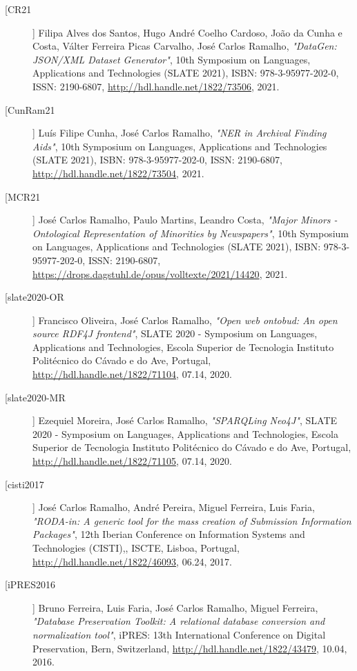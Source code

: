 \begin{description}
\item[[CR21]]
    \textsf{Filipa Alves dos Santos, Hugo André Coelho Cardoso, João da Cunha e Costa, Válter Ferreira Picas Carvalho, José Carlos Ramalho}, \emph{"DataGen: JSON/XML Dataset Generator"}, 10th Symposium on Languages, Applications and Technologies (SLATE 2021), ISBN: 978-3-95977-202-0, ISSN: 2190-6807, \url{http://hdl.handle.net/1822/73506}, 2021.

\item[[CunRam21]]
    \textsf{Luís Filipe Cunha, José Carlos Ramalho}, \emph{"NER in Archival Finding Aids"}, 10th Symposium on Languages, Applications and Technologies (SLATE 2021), ISBN: 978-3-95977-202-0, ISSN: 2190-6807, \url{http://hdl.handle.net/1822/73504}, 2021.

\item[[MCR21]]
    \textsf{José Carlos Ramalho, Paulo Martins, Leandro Costa}, \emph{"Major Minors - Ontological Representation of Minorities by Newspapers"}, 10th Symposium on Languages, Applications and Technologies (SLATE 2021), ISBN: 978-3-95977-202-0, ISSN: 2190-6807, \url{https://drops.dagstuhl.de/opus/volltexte/2021/14420}, 2021.

\item[[slate2020-OR]]
    \textsf{Francisco Oliveira, José Carlos Ramalho}, \emph{"Open web ontobud: An open source RDF4J frontend"}, SLATE 2020 - Symposium on Languages, Applications and Technologies, Escola Superior de Tecnologia Instituto Politécnico do Cávado e do Ave, Portugal, \url{http://hdl.handle.net/1822/71104}, 07.14, 2020.

\item[[slate2020-MR]]
    \textsf{Ezequiel Moreira, José Carlos Ramalho}, \emph{"SPARQLing Neo4J"}, SLATE 2020 - Symposium on Languages, Applications and Technologies, Escola Superior de Tecnologia Instituto Politécnico do Cávado e do Ave, Portugal, \url{http://hdl.handle.net/1822/71105}, 07.14, 2020.

\item[[cisti2017]]
    \textsf{José Carlos Ramalho, André Pereira, Miguel Ferreira, Luis Faria}, \emph{"RODA-in: A generic tool for the mass creation of Submission Information Packages"}, 12th Iberian Conference on Information Systems and Technologies (CISTI),, ISCTE, Lisboa, Portugal, \url{http://hdl.handle.net/1822/46093}, 06.24, 2017.

\item[[iPRES2016]]
    \textsf{Bruno Ferreira, Luis Faria, José Carlos Ramalho, Miguel Ferreira}, \emph{"Database Preservation Toolkit: A relational database conversion and normalization tool"}, iPRES: 13th International Conference on Digital Preservation, Bern, Switzerland, \url{http://hdl.handle.net/1822/43479}, 10.04, 2016.


\end{description}
